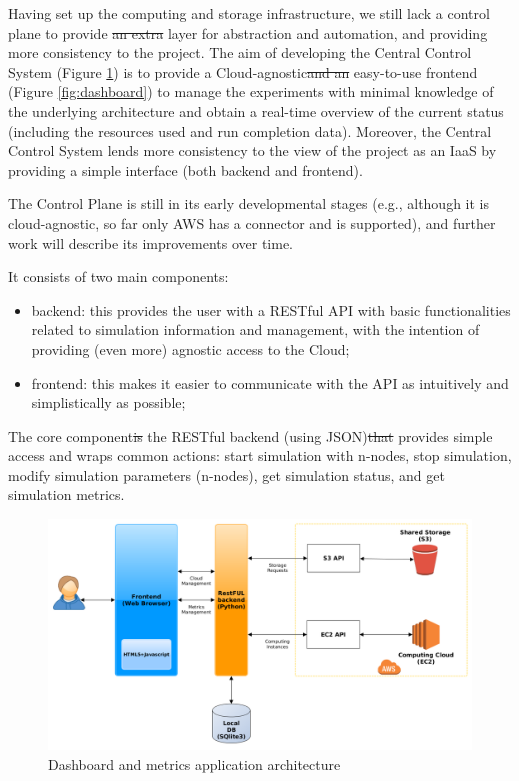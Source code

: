 \documentclass[journal abbreviation, manuscript]{copernicus}
\providecommand{\DIFadd}[1]{{\protect\color{blue}\uwave{#1}}} %
\providecommand{\DIFdel}[1]{{\protect\color{red}\sout{#1}}}                      %
\providecommand{\DIFaddbegin}{} %
\providecommand{\DIFaddend}{} %
\providecommand{\DIFdelbegin}{} %
\providecommand{\DIFdelend}{} %
\begin{document}
\label{section:control_plane}

\DIFaddend Having set up the computing and storage infrastructure, we still lack a control plane to provide \DIFdelbegin \DIFdel{an extra }\DIFdelend \DIFaddbegin \DIFadd{a }\DIFaddend layer for abstraction and automation, and providing more consistency to the project. The aim of developing the Central Control System (Figure \ref{fig:dashboard_architecture}) is to provide a Cloud-agnostic\DIFdelbegin \DIFdel{and an }\DIFdelend \DIFaddbegin \DIFadd{, }\DIFaddend easy-to-use frontend (Figure \ref{fig:dashboard}) to manage the experiments with minimal knowledge of the underlying architecture and obtain a real-time overview of the current status (including the resources used and run completion data). Moreover, the Central Control System lends more consistency to the view of the project as an IaaS by providing a simple interface (both backend and frontend).

The Control Plane is still in its early developmental stages (e.g., although it is cloud-agnostic, so far only AWS has a connector and is supported), and further work will describe its improvements over time.

It consists of two main components:

\begin{itemize}
 \item backend: this provides the user with a RESTful API with basic functionalities related to simulation information and management, with the intention of providing (even more) agnostic access to the Cloud;
 \item frontend: this makes it easier to communicate with the API as intuitively and simplistically as possible;
\end{itemize}

 The core component\DIFdelbegin \DIFdel{is }\DIFdelend \DIFaddbegin \DIFadd{, }\DIFaddend the RESTful backend (using JSON)\DIFdelbegin \DIFdel{that }\DIFdelend \DIFaddbegin \DIFadd{, }\DIFaddend provides simple access and wraps common actions: start simulation with n-nodes, stop simulation, modify simulation parameters (n-nodes), get simulation status, and get simulation metrics.


\begin{figure}[!h]
\centering
\includegraphics[width=6.5in]{images/dashboard_architecture}
\caption{Dashboard and metrics application architecture}
\label{fig:dashboard_architecture}
\end{figure}
\end{document}
